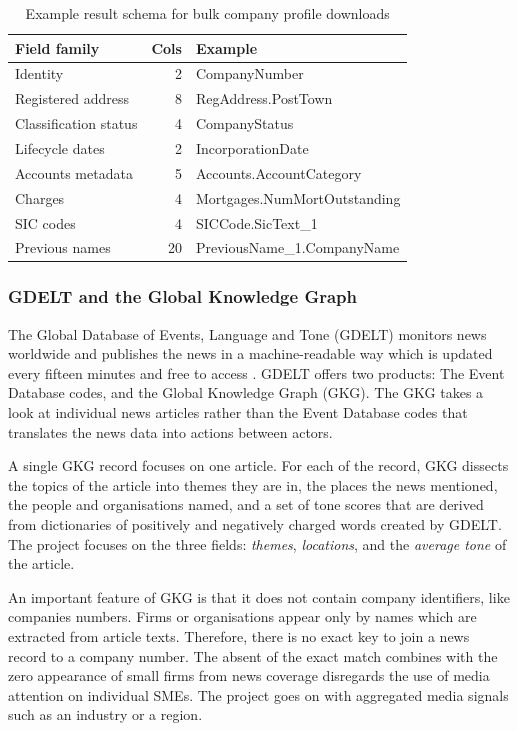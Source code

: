 \documentclass[ %
                    author={Natchalin Iwsakul \\[0.4em] Inkaphol Siriwongwattana \\[0.4em] Tanaphan Kummaraphat \\[0.6em] Patorn Srisupap},,
                supervisor={Fernando Moreno-Pino},
                    degree={MSc},
                     title={Propensity Modelling for SME Commercial Lending Using Open Public Data
},
                  subtitle={Companies House and GDELT as predictors of first-time borrowing},
                      type={},
                      year={2026}]{dissertation}
\begin{document}
\begin{table}[h]
    \centering

    \begin{tabular}{lrl}
        \toprule
        Field family & Cols	& Example \\
        \midrule
        Identity & 2 & CompanyNumber \\
        Registered address & 8 & RegAddress.PostTown \\
        Classification status & 4 & CompanyStatus \\
        Lifecycle dates & 2 & IncorporationDate \\
        Accounts metadata & 5 & Accounts.AccountCategory \\
        Charges & 4 & Mortgages.NumMortOutstanding \\
        SIC codes & 4 & SICCode.SicText\_1 \\
        Previous names & 20 & PreviousName\_1.CompanyName \\
        \bottomrule
    \end{tabular}
    \caption{Example result schema for bulk company profile downloads}
    \label{tab:bulk_profile_example_schema}
\end{table}
\subsubsection{GDELT and the Global Knowledge Graph}
\label{sec:gdelt}

The Global Database of Events, Language and Tone (GDELT) monitors news worldwide and publishes the news in a machine-readable way which is updated every fifteen minutes and free to access \cite{leetaru2013gdelt}. GDELT offers two products: The Event Database codes, and the Global Knowledge Graph (GKG). The GKG takes a look at individual news articles rather than the Event Database codes that translates the news data into actions between actors.

A single GKG record focuses on one article. For each of the record, GKG dissects the topics of the article into themes they are in, the places the news mentioned, the people and organisations named, and a set of tone scores that are derived from dictionaries of positively and negatively charged words created by GDELT. The project focuses on the three fields: \textit{themes}, \textit{locations}, and the \textit{average tone} of the article.

An important feature of GKG is that it does not contain company identifiers, like companies numbers. Firms or organisations appear only by names which are extracted from article texts. Therefore, there is no exact key to join a news record to a company number. The absent of the exact match combines with the zero appearance of small firms from news coverage disregards the use of media attention on individual SMEs. The project goes on with aggregated media signals such as an industry or a region.
\end{document}
